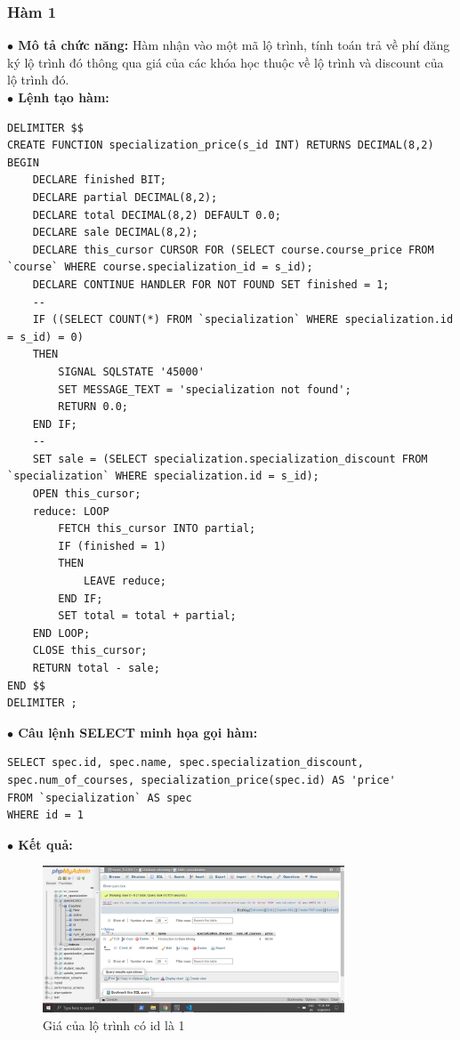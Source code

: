 \documentclass[12pt,a4paper,titlepage]{article}
\begin{document}
\subsubsection{Hàm 1}
\textbf{$\bullet$ Mô tả chức năng:} Hàm nhận vào một mã lộ trình, tính toán trả về phí đăng ký lộ trình đó thông qua giá của các khóa học thuộc về lộ trình và discount của lộ trình đó.\\
\textbf{$\bullet$ Lệnh tạo hàm:}
\begin{lstlisting}
DELIMITER $$
CREATE FUNCTION specialization_price(s_id INT) RETURNS DECIMAL(8,2)
BEGIN
	DECLARE finished BIT;
	DECLARE partial DECIMAL(8,2);
	DECLARE total DECIMAL(8,2) DEFAULT 0.0;
	DECLARE sale DECIMAL(8,2);
	DECLARE this_cursor CURSOR FOR (SELECT course.course_price FROM `course` WHERE course.specialization_id = s_id);
	DECLARE CONTINUE HANDLER FOR NOT FOUND SET finished = 1;
	--
	IF ((SELECT COUNT(*) FROM `specialization` WHERE specialization.id = s_id) = 0)
	THEN
		SIGNAL SQLSTATE '45000'
		SET MESSAGE_TEXT = 'specialization not found';
		RETURN 0.0;
	END IF;
	--
	SET sale = (SELECT specialization.specialization_discount FROM `specialization` WHERE specialization.id = s_id);
	OPEN this_cursor;
	reduce: LOOP
		FETCH this_cursor INTO partial;
		IF (finished = 1)
		THEN
			LEAVE reduce;
		END IF;
		SET total = total + partial;
	END LOOP;
	CLOSE this_cursor;
	RETURN total - sale;
END $$
DELIMITER ;
\end{lstlisting}
\textbf{$\bullet$ Câu lệnh SELECT minh họa gọi hàm:}
\begin{lstlisting}
SELECT spec.id, spec.name, spec.specialization_discount, spec.num_of_courses, specialization_price(spec.id) AS 'price'
FROM `specialization` AS spec
WHERE id = 1
\end{lstlisting}
\textbf{$\bullet$ Kết quả:}
\newpage
\begin{figure}[h!]
	\centering
	\caption{Giá của lộ trình có id là 1}
	\includegraphics[width=0.8\textwidth]{images/specprice.png}
\end{figure}
\end{document}

